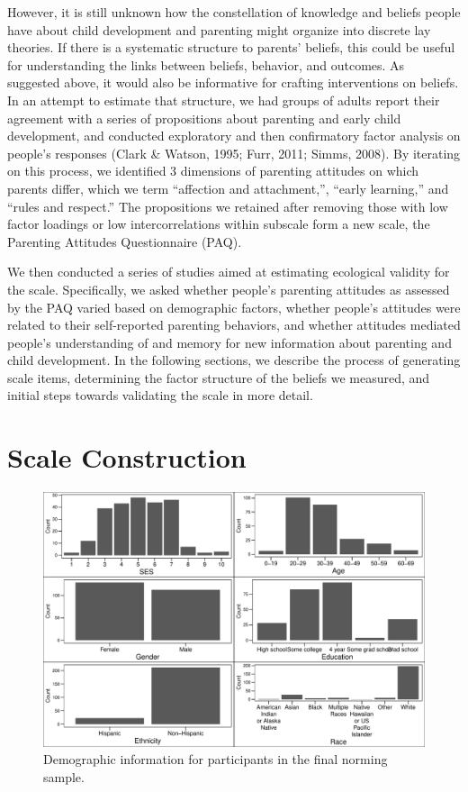 \documentclass[floatsintext,man]{apa6}
\theoremstyle{definition}
\theoremstyle{definition}
\theoremstyle{definition}
\theoremstyle{remark}
\begin{document}
However, it is still unknown how the constellation of knowledge and
beliefs people have about child development and parenting might organize
into discrete lay theories. If there is a systematic structure to
parents' beliefs, this could be useful for understanding the links
between beliefs, behavior, and outcomes. As suggested above, it would
also be informative for crafting interventions on beliefs. In an attempt
to estimate that structure, we had groups of adults report their
agreement with a series of propositions about parenting and early child
development, and conducted exploratory and then confirmatory factor
analysis on people's responses (Clark \& Watson, 1995; Furr, 2011;
Simms, 2008). By iterating on this process, we identified 3 dimensions
of parenting attitudes on which parents differ, which we term
\enquote{affection and attachment,}, \enquote{early learning,} and
\enquote{rules and respect.} The propositions we retained after removing
those with low factor loadings or low intercorrelations within subscale
form a new scale, the Parenting Attitudes Questionnaire (PAQ).

We then conducted a series of studies aimed at estimating ecological
validity for the scale. Specifically, we asked whether people's
parenting attitudes as assessed by the PAQ varied based on demographic
factors, whether people's attitudes were related to their self-reported
parenting behaviors, and whether attitudes mediated people's
understanding of and memory for new information about parenting and
child development. In the following sections, we describe the process of
generating scale items, determining the factor structure of the beliefs
we measured, and initial steps towards validating the scale in more
detail.

\section{Scale Construction}\label{scale-construction}

\begin{figure}
\centering
\includegraphics{PAQ_paper_files/figure-latex/normdemo-1.pdf}
\caption{\label{fig:normdemo}Demographic information for participants in the
final norming sample.}
\end{figure}
\end{document}
